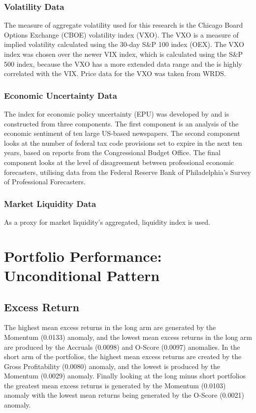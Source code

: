 \documentclass[12pt, a4paper, oneside]{article}
\begin{document}
\subsubsection{Volatility Data}
The measure of aggregate volatility used for this research is the Chicago Board Options Exchange (CBOE) volatility index (VXO). The VXO is a measure of implied volatility calculated using the 30-day S\&P 100 index (OEX). The VXO index was chosen over the newer VIX index, which is calculated using the S\&P 500 index, because the VXO has a more extended data range and the is highly correlated with the VIX. Price data for the VXO was taken from WRDS.

\subsubsection{Economic Uncertainty Data}
The index for economic policy uncertainty (EPU) was developed by\cite{baker2016measuring} and is constructed from three components. The first component is an analysis of the economic sentiment of ten large US-based newspapers. The second component looks at the number of federal tax code provisions set to expire in the next ten years, based on reports from the Congressional Budget Office. The final component looks at the level of disagreement between professional economic forecasters, utilising data from the Federal Reserve Bank of Philadelphia's Survey of Professional Forecasters.

\subsubsection{Market Liquidity Data}
As a proxy for market liquidity\cite{pastor2003liquidity}'s aggregated, liquidity index is used. 


\section{Portfolio Performance: Unconditional Pattern}\label{sec:unconditional}
\subsection{Excess Return }
The highest mean excess returns in the long arm are generated by the Momentum (0.0133) anomaly, and the lowest mean excess returns in the long arm are produced by the Accruals (0.0098) and O-Score (0.0097) anomalies. In the short arm of the portfolios, the highest mean excess returns are created by the Gross Profitability (0.0080) anomaly, and the lowest is produced by the Momentum (0.0029) anomaly. Finally looking at the long minus short portfolios the greatest mean excess returns is generated by the Momentum (0.0103) anomaly with the lowest mean returns being generated by the O-Score (0.0021) anomaly.
\end{document}
